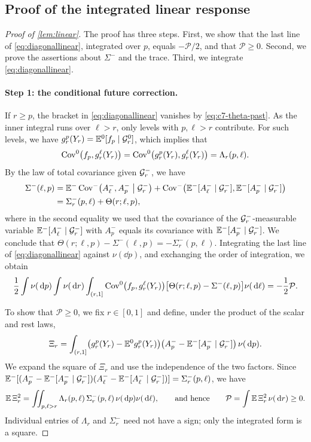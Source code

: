 \subsection{Proof of the integrated linear response}

\begin{proof}[Proof of \cref{lem:linear}]
The proof has three steps. First, we show that the last line of
\eqref{eq:diagonallinear}, integrated over $p$, equals
$-\mathcal P/2$, and that $\mathcal P\ge0$. Second, we prove the
assertions about $\Sigma^-$ and the trace. Third, we integrate
\eqref{eq:diagonallinear}.

\paragraph{Step 1: the conditional future correction.}
If $r\ge p$, the bracket in \eqref{eq:diagonallinear} vanishes by
\eqref{eq:c7-theta-past}. As the inner integral runs over $\ell>r$,
only levels with $p,\ell>r$ contribute. For such levels, we have
$g_r^p(Y_r)=\mathbb E^0[f_p\mid\mathcal G^0_r]$, which implies that
\[
 \operatorname{Cov}^0\bigl(f_p,g_r^\ell(Y_r)\bigr)
 =\operatorname{Cov}^0\bigl(g_r^p(Y_r),g_r^\ell(Y_r)\bigr)=\Lambda_r(p,\ell).
\]
By the law of total covariance given $\mathcal G^-_r$, we have
\[
 \begin{aligned}
 \Sigma^-(\ell,p)
 &=\mathbb E^-\operatorname{Cov}^-\bigl(A_\ell^-,A_p^-\bigm|\mathcal G^-_r\bigr)
 +\operatorname{Cov}^-\bigl(\mathbb E^-[A_\ell^-\mid\mathcal G^-_r],\mathbb E^-[A_p^-\mid\mathcal G^-_r]\bigr)\\
 &=\Sigma^-_r(p,\ell)+\Theta(r;\ell,p),
 \end{aligned}
\]
where in the second equality we used that the covariance of the
$\mathcal G^-_r$-measurable variable $\mathbb E^-[A_\ell^-\mid\mathcal G^-_r]$ with
$A_p^-$ equals its covariance with $\mathbb E^-[A_p^-\mid\mathcal G^-_r]$. We
conclude that $\Theta(r;\ell,p)-\Sigma^-(\ell,p)=-\Sigma^-_r(p,\ell)$. Integrating
the last line of \eqref{eq:diagonallinear} against $\nu(\dd p)$, and
exchanging the order of integration, we obtain
\begin{equation}\label{eq:c7-correction-integrated}
 \frac12\int\nu(\,\mathrm d p)\int\nu(\,\mathrm d r)\int_{(r,1]}
  \operatorname{Cov}^0\bigl(f_p,g_r^\ell(Y_r)\bigr)
    \bigl[\Theta(r;\ell,p)-\Sigma^-(\ell,p)\bigr]\nu(\,\mathrm d\ell)
 =-\frac12\mathcal P.
\end{equation}

To show that $\mathcal P\ge0$, we fix $r\in[0,1]$ and define, under the
product of the scalar and rest laws,
\[
 \Xi_r=\int_{(r,1]}
   \bigl(g_r^p(Y_r)-\mathbb E^0g_r^p(Y_r)\bigr)
   \bigl(A_p^--\mathbb E^-[A_p^-\mid\mathcal G_r^-]\bigr)\,\nu(\,\mathrm d p).
\]
We expand the square of $\Xi_r$ and use the independence of the two
factors. Since
$\mathbb E^-[(A_p^--\mathbb E^-[A_p^-\mid\mathcal G^-_r])(A_\ell^--\mathbb E^-[A_\ell^-\mid\mathcal G^-_r])]
=\Sigma^-_r(p,\ell)$, we have
\[
 \mathbb E\,\Xi_r^2=\iint_{p,\ell>r}\Lambda_r(p,\ell)\,\Sigma_r^-(p,\ell)
 \,\nu(\,\mathrm d p)\nu(\,\mathrm d\ell),
 \qquad\text{and hence}\qquad
 \mathcal P=\int\mathbb E\,\Xi_r^2\,\nu(\,\mathrm d r)\ge0.
\]
Individual entries of $\Lambda_r$ and $\Sigma^-_r$ need not have a
sign; only the integrated form is a square.


\end{proof}
